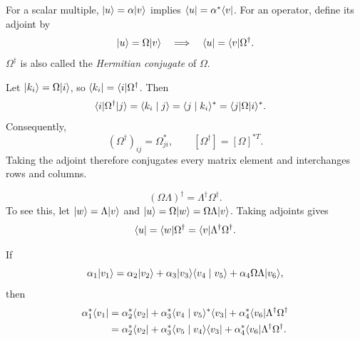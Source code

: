 For a scalar multiple, $\lvert u\rangle=\alpha\lvert v\rangle$ implies
$\langle u\rvert=\alpha^*\langle v\rvert$. For an operator, define its adjoint by
\[
 \lvert u\rangle=\Omega\lvert v\rangle
 \quad\Longrightarrow\quad
 \langle u\rvert=\langle v\rvert\Omega^\dagger.
\]
$\Omega^\dagger$ is also called the \emph{Hermitian conjugate} of
$\Omega$.

Let $\lvert k_i\rangle=\Omega\lvert i\rangle$, so
$\langle k_i\rvert=\langle i\rvert\Omega^\dagger$. Then
\begin{align*}
 \langle i\rvert \Omega^\dagger\lvert j\rangle
 &=\langle k_i\mid j\rangle
 =\langle j\mid k_i\rangle^{*}
 =\langle j\rvert \Omega\lvert i\rangle^{*}.
\end{align*}
Consequently,
\[
 (\Omega^\dagger)_{ij}=\Omega_{ji}^{*},
 \qquad [\Omega^\dagger]=[\Omega]^{*T}.
\]
Taking the adjoint therefore conjugates every matrix element and
interchanges rows and columns.

\[
 \boxed{(\Omega\Lambda)^\dagger=\Lambda^\dagger\Omega^\dagger.}
\]
To see this, let $\lvert w\rangle=\Lambda\lvert v\rangle$ and
$\lvert u\rangle=\Omega\lvert w\rangle=\Omega\Lambda\lvert v\rangle$. Taking adjoints gives
\[
 \langle u\rvert=\langle w\rvert\Omega^\dagger
 =\langle v\rvert\Lambda^\dagger\Omega^\dagger.
\]

If
\[
 \alpha_1\lvert v_1\rangle
 =\alpha_2\lvert v_2\rangle
 +\alpha_3\lvert v_3\rangle\langle v_4\mid v_5\rangle
 +\alpha_4\Omega\Lambda\lvert v_6\rangle,
\]
then
\begin{align*}
 \alpha_1^*\langle v_1\rvert
 &=\alpha_2^*\langle v_2\rvert
 +\alpha_3^*\langle v_4\mid v_5\rangle^{*}\langle v_3\rvert
 +\alpha_4^*\langle v_6\rvert\Lambda^\dagger\Omega^\dagger\\
 &=\alpha_2^*\langle v_2\rvert
 +\alpha_3^*\langle v_5\mid v_4\rangle\langle v_3\rvert
 +\alpha_4^*\langle v_6\rvert\Lambda^\dagger\Omega^\dagger.
\end{align*}
